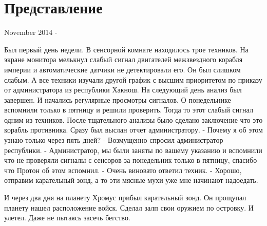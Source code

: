 \newpage
\chapter{Представление}
{ November 2014 - \par
}
Был первый день недели. В сенсорной комнате находилось трое техников.
На экране монитора мелькнул 
слабый сигнал двигателей межзвездного корабля империи и автоматические датчики
не детектировали его. Он был слишком слабым. А все техники изучали другой
график с высшим приоритетом по приказу от администратора из республики Хакнош.
На следующий день анализ был завершен. И начались регулярные просмотры сигналов.
О понедельнике вспомнили только в пятницу и решили проверить. Тогда то
этот слабый сигнал одним из техников. После тщательного анализы было сделано
заключение что это корабль противника. Сразу был выслан отчет администратору.
- Почему я об этом узнаю только через пять дней? - Возмущенно спросил администратор республики.
- Администратор, мы были заняты по вашему указанию и вспомнили что не проверяли сигналы
с сенсоров за понедельник только в пятницу, спасибо что Протон об этом
вспомнил. - Очень виновато ответил техник.
- Хорошо, отправим карательный зонд, а то эти мясные мухи уже мне начинают надоедать.
\par
И через два дня на планету Хромус прибыл карательный зонд.
Он прощупал планету нашел расположение войск. Сделал залп свои оружием по островку.
И улетел. Даже не пытаясь засечь бегство.
